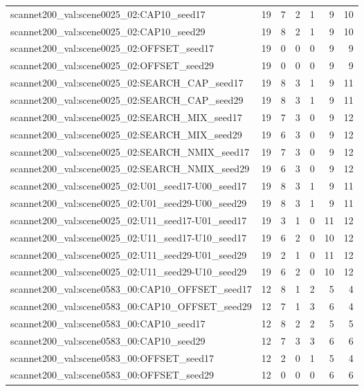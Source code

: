 \begin{table}[t]
\begin{tabular}{lrrrrrr}
scannet200\_val:scene0025\_02:CAP10\_seed17 & 19 & 7 & 2 & 1 & 9 & 10 \\
scannet200\_val:scene0025\_02:CAP10\_seed29 & 19 & 8 & 2 & 1 & 9 & 10 \\
scannet200\_val:scene0025\_02:OFFSET\_seed17 & 19 & 0 & 0 & 0 & 9 & 9 \\
scannet200\_val:scene0025\_02:OFFSET\_seed29 & 19 & 0 & 0 & 0 & 9 & 9 \\
scannet200\_val:scene0025\_02:SEARCH\_CAP\_seed17 & 19 & 8 & 3 & 1 & 9 & 11 \\
scannet200\_val:scene0025\_02:SEARCH\_CAP\_seed29 & 19 & 8 & 3 & 1 & 9 & 11 \\
scannet200\_val:scene0025\_02:SEARCH\_MIX\_seed17 & 19 & 7 & 3 & 0 & 9 & 12 \\
scannet200\_val:scene0025\_02:SEARCH\_MIX\_seed29 & 19 & 6 & 3 & 0 & 9 & 12 \\
scannet200\_val:scene0025\_02:SEARCH\_NMIX\_seed17 & 19 & 7 & 3 & 0 & 9 & 12 \\
scannet200\_val:scene0025\_02:SEARCH\_NMIX\_seed29 & 19 & 6 & 3 & 0 & 9 & 12 \\
scannet200\_val:scene0025\_02:U01\_seed17-U00\_seed17 & 19 & 8 & 3 & 1 & 9 & 11 \\
scannet200\_val:scene0025\_02:U01\_seed29-U00\_seed29 & 19 & 8 & 3 & 1 & 9 & 11 \\
scannet200\_val:scene0025\_02:U11\_seed17-U01\_seed17 & 19 & 3 & 1 & 0 & 11 & 12 \\
scannet200\_val:scene0025\_02:U11\_seed17-U10\_seed17 & 19 & 6 & 2 & 0 & 10 & 12 \\
scannet200\_val:scene0025\_02:U11\_seed29-U01\_seed29 & 19 & 2 & 1 & 0 & 11 & 12 \\
scannet200\_val:scene0025\_02:U11\_seed29-U10\_seed29 & 19 & 6 & 2 & 0 & 10 & 12 \\
scannet200\_val:scene0583\_00:CAP10\_OFFSET\_seed17 & 12 & 8 & 1 & 2 & 5 & 4 \\
scannet200\_val:scene0583\_00:CAP10\_OFFSET\_seed29 & 12 & 7 & 1 & 3 & 6 & 4 \\
scannet200\_val:scene0583\_00:CAP10\_seed17 & 12 & 8 & 2 & 2 & 5 & 5 \\
scannet200\_val:scene0583\_00:CAP10\_seed29 & 12 & 7 & 3 & 3 & 6 & 6 \\
scannet200\_val:scene0583\_00:OFFSET\_seed17 & 12 & 2 & 0 & 1 & 5 & 4 \\
scannet200\_val:scene0583\_00:OFFSET\_seed29 & 12 & 0 & 0 & 0 & 6 & 6 \\

\end{tabular}
\end{table}
